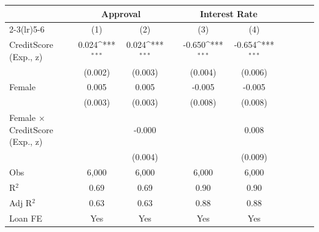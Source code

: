 {\def\sym#1{\ifmmode^{#1}\else\(^{#1}\)\fi}
\begin{tabular}{l*{9}{c}} \toprule
                &\multicolumn{2}{c}{Approval}         &         &\multicolumn{2}{c}{Interest Rate}    \\\cmidrule(lr){2-3}\cmidrule(lr){5-6}
                &\multicolumn{1}{c}{(1)}         &\multicolumn{1}{c}{(2)}         &         &\multicolumn{1}{c}{(3)}         &\multicolumn{1}{c}{(4)}         \\
\midrule
CreditScore (Exp., z)&    0.024\sym{***}&    0.024\sym{***}&         &   -0.650\sym{***}&   -0.654\sym{***}\\
                &  (0.002)         &  (0.003)         &         &  (0.004)         &  (0.006)         \\
Female          &    0.005         &    0.005         &         &   -0.005         &   -0.005         \\
                &  (0.003)         &  (0.003)         &         &  (0.008)         &  (0.008)         \\
Female $\times$ CreditScore (Exp., z)&                  &   -0.000         &         &                  &    0.008         \\
                &                  &  (0.004)         &         &                  &  (0.009)         \\
\midrule
Obs             &    6,000         &    6,000         &         &    6,000         &    6,000         \\
R$^2$           &     0.69         &     0.69         &         &     0.90         &     0.90         \\
Adj R$^2$       &     0.63         &     0.63         &         &     0.88         &     0.88         \\
Loan FE         &      Yes         &      Yes         &         &      Yes         &      Yes         \\
\bottomrule
\end{tabular}
}
